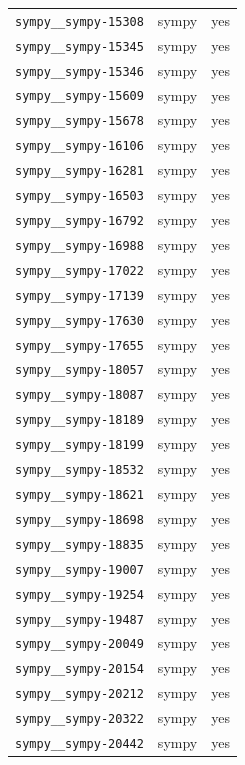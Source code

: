 \begin{longtable}{@{}p{}lp{}@{}}
\texttt{sympy\_\_sympy-15308} & sympy & yes \\
\texttt{sympy\_\_sympy-15345} & sympy & yes \\
\texttt{sympy\_\_sympy-15346} & sympy & yes \\
\texttt{sympy\_\_sympy-15609} & sympy & yes \\
\texttt{sympy\_\_sympy-15678} & sympy & yes \\
\texttt{sympy\_\_sympy-16106} & sympy & yes \\
\texttt{sympy\_\_sympy-16281} & sympy & yes \\
\texttt{sympy\_\_sympy-16503} & sympy & yes \\
\texttt{sympy\_\_sympy-16792} & sympy & yes \\
\texttt{sympy\_\_sympy-16988} & sympy & yes \\
\texttt{sympy\_\_sympy-17022} & sympy & yes \\
\texttt{sympy\_\_sympy-17139} & sympy & yes \\
\texttt{sympy\_\_sympy-17630} & sympy & yes \\
\texttt{sympy\_\_sympy-17655} & sympy & yes \\
\texttt{sympy\_\_sympy-18057} & sympy & yes \\
\texttt{sympy\_\_sympy-18087} & sympy & yes \\
\texttt{sympy\_\_sympy-18189} & sympy & yes \\
\texttt{sympy\_\_sympy-18199} & sympy & yes \\
\texttt{sympy\_\_sympy-18532} & sympy & yes \\
\texttt{sympy\_\_sympy-18621} & sympy & yes \\
\texttt{sympy\_\_sympy-18698} & sympy & yes \\
\texttt{sympy\_\_sympy-18835} & sympy & yes \\
\texttt{sympy\_\_sympy-19007} & sympy & yes \\
\texttt{sympy\_\_sympy-19254} & sympy & yes \\
\texttt{sympy\_\_sympy-19487} & sympy & yes \\
\texttt{sympy\_\_sympy-20049} & sympy & yes \\
\texttt{sympy\_\_sympy-20154} & sympy & yes \\
\texttt{sympy\_\_sympy-20212} & sympy & yes \\
\texttt{sympy\_\_sympy-20322} & sympy & yes \\
\texttt{sympy\_\_sympy-20442} & sympy & yes \\

\end{longtable}
